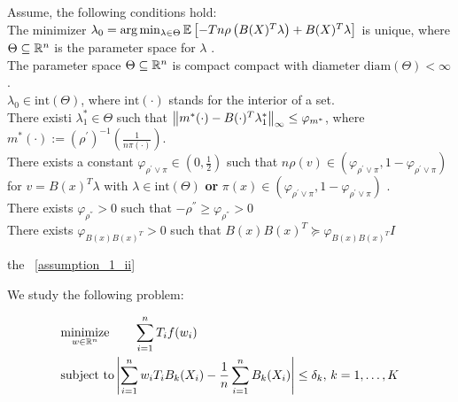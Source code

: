 \begin{asu}
  \label{assumption_1}
  Assume, the following conditions hold:
  \\
  \subasu 
  \label{assumption_1_i} 
  The minimizer 
  $
  \lambda_0 
  =
  \arg \min_{\lambda \in \Theta}
  \mathbb{E}
  \left[ 
    -T n 
    \rho 
    \left( 
    B(X)^T \lambda
    \right)
    +
    B(X)^T \lambda
  \right]
  $
  is unique,
  where 
  $\Theta \subseteq \mathbb{R}^n$ is the parameter space for $\lambda$
  .
  \\
  \subasu 
  \label{assumption_1_ii} 
  The parameter space 
  $\Theta \subseteq \mathbb{R}^n$
  is compact compact with diameter
  $\text{diam}(\Theta) < \infty$
  .
  \\
  \subasu 
  \label{assumption_1_iii}
  $\lambda_0 \in \text{int}(\Theta)$,
  where
  $\text{int}(\cdot)$
  stands for the interior of a set.
  \\
  \subasu
  \label{assumption_1_iv}
  There existi
  $\lambda^*_1 \in \Theta$
  such that
  $
  \left\lVert
    m^*(\cdot)
    -
    B(\cdot)^T \lambda^*_1
  \right\rVert_\infty
  \le 
  \varphi_{m^*}
  $,
  where
  $
  m^*(\cdot)
  :=
  \left( \rho^{'} \right)^{-1}
  \left( 
  \frac{1}{n \pi(\cdot)}
  \right)  
  .
  $
  \\
  \subasu
  \label{assumption_1_v}
  There exists a constant 
  $\varphi_{\rho^{'} \lor \pi} \in \left(0, \frac{1}{2} \right)$
  such that
  $
  n\rho(v) \in (
  \varphi_{\rho^{'} \lor \pi},
  1 - \varphi_{\rho^{'} \lor \pi}
  )
  $
  for $v=B(x)^T \lambda$ with $\lambda \in \text{int}(\Theta)$ 
  \textbf{or}
  $
  \pi(x) \in (
  \varphi_{\rho^{'} \lor \pi},
  1 - \varphi_{\rho^{'} \lor \pi}
  )
  $
  .
  \\
  \subasu
  \label{assumption_1_vi}
  There exists 
  $\varphi_{\rho^{''}} > 0 $
  such that
  $-\rho^{''} \ge \varphi_{\rho^{''}} > 0 $
  \\ 
  \subasu
  \label{assumption_1_vii}
  There exists 
  $\varphi_{B(x) B(x)^T} > 0$ 
  such that
  $
   B(x) B(x)^T 
   \succcurlyeq 
   \varphi_{B(x) B(x)^T} I 
  $
\end{asu}


the ~\ref{assumption_1_ii}

We study the following problem:

\begin{align}
  \label{primal_weighting_binary}
  \begin{split}
  &\underset{w \in \mathbb{R}^n}{\text{minimize}}
  \qquad
  \sum_{i = 1}^{n} T_i f(w_i)
  \\
  &\text{subject to}
  \left| 
    \sum_{i = 1}^{n} w_i T_i B_k(X_i)
    - 
    \frac{1}{n} \sum_{i = 1}^{n} B_k(X_i)
  \right|
  \le 
  \delta_k,\,
  k = 1, \ldots, K
  \end{split}
\end{align}


